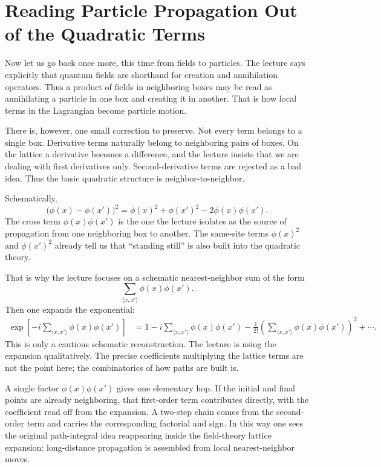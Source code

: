 \section{Reading Particle Propagation Out of the Quadratic Terms}

Now let us go back once more, this time from fields to particles. The lecture says explicitly that quantum fields are shorthand for creation and annihilation operators. Thus a product of fields in neighboring boxes may be read as annihilating a particle in one box and creating it in another. That is how local terms in the Lagrangian become particle motion.

There is, however, one small correction to preserve. Not every term belongs to a single box. Derivative terms naturally belong to neighboring pairs of boxes. On the lattice a derivative becomes a difference, and the lecture insists that we are dealing with first derivatives only. Second-derivative terms are rejected as a bad idea. Thus the basic quadratic structure is neighbor-to-neighbor.

Schematically,
\begin{equation}
\bigl(\phi(x)-\phi(x')\bigr)^2
=
\phi(x)^2+\phi(x')^2-2\phi(x)\phi(x').
\end{equation}
The cross term \(\phi(x)\phi(x')\) is the one the lecture isolates as the source of propagation from one neighboring box to another. The same-site terms \(\phi(x)^2\) and \(\phi(x')^2\) already tell us that ``standing still'' is also built into the quadratic theory.

That is why the lecture focuses on a schematic nearest-neighbor sum of the form
\begin{equation}
\sum_{\langle x,x'\rangle}\phi(x)\phi(x').
\end{equation}
Then one expands the exponential:
\begin{align}
\exp\!\left[-i\sum_{\langle x,x'\rangle}\phi(x)\phi(x')\right]
&=
1
-i\sum_{\langle x,x'\rangle}\phi(x)\phi(x')
-\frac{1}{2!}\left(\sum_{\langle x,x'\rangle}\phi(x)\phi(x')\right)^2
+\cdots .
\end{align}
This is only a cautious schematic reconstruction. The lecture is using the expansion qualitatively. The precise coefficients multiplying the lattice terms are not the point here; the combinatorics of how paths are built is.

A single factor \(\phi(x)\phi(x')\) gives one elementary hop. If the initial and final points are already neighboring, that first-order term contributes directly, with the coefficient read off from the expansion. A two-step chain comes from the second-order term and carries the corresponding factorial and sign. In this way one sees the original path-integral idea reappearing inside the field-theory lattice expansion: long-distance propagation is assembled from local nearest-neighbor moves.


